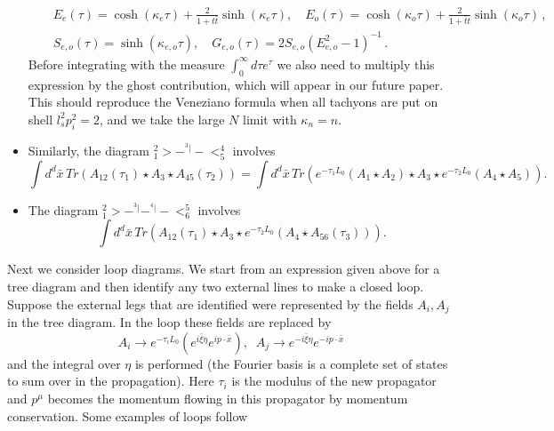 \documentclass[a4paper,11pt]{article}
\begin{document}
\begin{itemize}
\begin{eqnarray}
&&E_{e}\left(\tau\right)=\cosh \left( \kappa _{e}\tau
\right) +\frac{2}{1+t\bar{t}}\sinh (\kappa _{e}\tau ),\quad
E_{o}\left( \tau \right)=\cosh \left( \kappa _{o}\tau
\right) +\frac{2}{1+\bar{t}t}\sinh (\kappa _{o}\tau )\,, \\
&&S_{e,o}\left( \tau \right)  =\sinh (\kappa _{e,o}\tau ),\quad
G_{e,o}\left( \tau \right) =2S_{e,o}\left( E_{e,o}^{2}-1\right) ^{-1}\,.
\end{eqnarray}
Before integrating with the measure
  $\int_0^{\infty} d\tau e^{\tau}$
we also need to multiply this expression by the ghost
contribution, which will appear in our future paper. This should
reproduce the Veneziano formula when all tachyons are put on shell
$l_s^2 p^2_i =2$, and we take the large $N$ limit with
$\kappa_n=n$.


\item Similarly, the diagram $_{1}^{2}{>}-^{^{3}|}-{<}_{5}^{4}$ involves
\begin{equation}
\int d^d\bar{x}\,Tr\left( A_{12}\left( \tau _{1}\right) \star A_{3}\star
A_{45}\left( \tau _{2}\right) \right) =\int d^d\bar{x}\,Tr\left( e^{-\tau
_{1}L_{0}}\left( A_{1}\star A_{2}\right) \star A_{3}\star e^{-\tau
_{2}L_{0}}\left( A_{4}\star A_{5}\right) \right) .
\end{equation}

\item The diagram $_{1}^{2}{>}-^{^{3}|}-^{^{4}|}-{<}_{6}^{5}$ involves
\begin{equation}
\int d^d\bar{x}\,Tr\left( A_{12}\left( \tau _{1}\right) \star A_{3}\star
e^{-\tau _{2}L_{0}}\left( A_{4}\star A_{56}\left( \tau _{3}\right) \right)
\right) .
\end{equation}
\end{itemize}

Next we consider loop diagrams. We start from an expression given above for
a tree diagram and then identify any two external lines to make a closed
loop. Suppose the external legs that are identified were represented by the
fields $A_{i},A_{j}$ in the tree diagram. In the loop these fields are
replaced by
\begin{equation}
A_{i}\rightarrow e^{-\tau _{i}L_{0}}\left( e^{i\bar{\xi}\eta }e^{ip\cdot
\bar{x}}\right) ,\;\;A_{j}\rightarrow e^{-i\bar{\xi}\eta }e^{-ip\cdot \bar{x}%
}
\end{equation}%
and the integral over $\eta $ is performed (the Fourier basis is a complete
set of states to sum over in the propagation). Here $\tau _{i}$ is the
modulus of the new propagator and $p^{\mu }$ becomes the momentum flowing in
this propagator by momentum conservation. Some examples of loops follow
\end{document}
